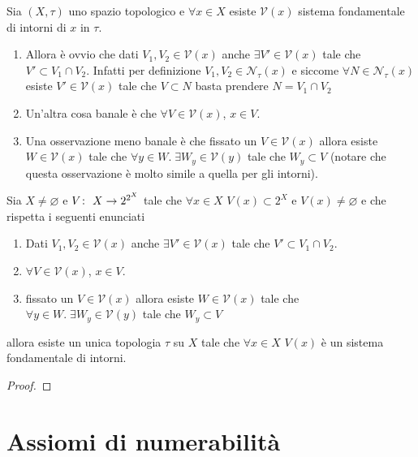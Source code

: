 \begin{remark}
	Sia $(X, \tau)$ uno spazio topologico e $\forall x \in X$ esiste $\mathcal{V}(x)$ sistema fondamentale di intorni di $x$ in $\tau$.
	\begin{enumerate}
		\item  Allora è ovvio che dati $V_1, V_2 \in \mathcal{V}(x)$ anche $\exists V' \in \mathcal{V}(x)$ tale che $V' \subset V_1 \cap V_2$. Infatti per definizione $V_1, V_2 \in \mathcal{N}_\tau(x)$ e siccome $\forall N \in \mathcal{N}_\tau(x)$ esiste $V' \in \mathcal{V}(x)$ tale che $V \subset N$ basta prendere $N = V_1 \cap V_2$
		\item Un'altra cosa banale è che $\forall V \in \mathcal{V}(x)$, $x \in V$.
		\item Una osservazione meno banale è che fissato un $V \in \mathcal{V}(x)$ allora esiste $W \in \mathcal{V}(x)$ tale che $\forall y \in W.\; \exists W_y \in \mathcal{V}(y)$ tale che $W_y \subset V$ (notare che questa osservazione è molto simile a quella per gli intorni).	
	\end{enumerate}
\end{remark}

\begin{theorem}
	\label{thr:sfi_generate_topology}
	Sia $X \neq \varnothing$ e $V \colon\ X \rightarrow 2^{2^X}$ tale che $\forall x \in X$ $V(x) \subset 2^X$ e $V(x) \neq \varnothing$ e che rispetta i seguenti enunciati
	\begin{enumerate}
		\item Dati $V_1, V_2 \in \mathcal{V}(x)$ anche $\exists V' \in \mathcal{V}(x)$ tale che $V' \subset V_1 \cap V_2$.
		\item $\forall V \in \mathcal{V}(x)$, $x \in V$.
		\item fissato un $V \in \mathcal{V}(x)$ allora esiste $W \in \mathcal{V}(x)$ tale che $\forall y \in W.\; \exists W_y \in \mathcal{V}(y)$ tale che $W_y \subset V$
	\end{enumerate}
	allora esiste un unica topologia $\tau$ su $X$ tale che $\forall x \in X$ $V(x)$ è un sistema fondamentale di intorni. 
\end{theorem}
\begin{proof}
\end{proof}

\section{Assiomi di numerabilità}

